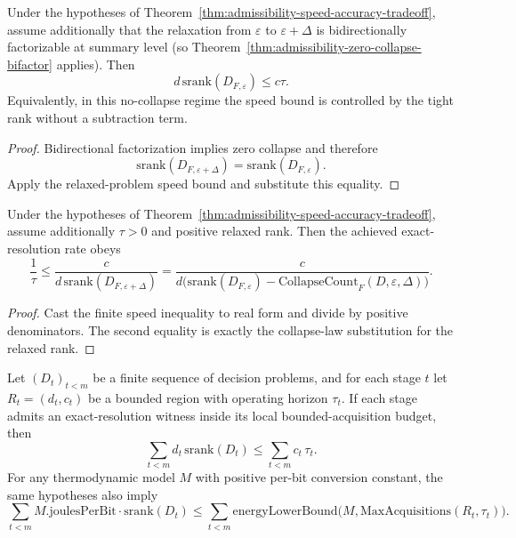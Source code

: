 \begin{theorem}\label{thm:admissibility-speed-accuracy-zero-collapse}
Under the hypotheses of Theorem~\ref{thm:admissibility-speed-accuracy-tradeoff}, assume additionally that the relaxation from $\varepsilon$ to $\varepsilon+\Delta$ is bidirectionally factorizable at summary level (so Theorem~\ref{thm:admissibility-zero-collapse-bifactor} applies). Then
\[
d\,\mathrm{srank}(D_{F,\varepsilon}) \le c\tau.
\]
Equivalently, in this no-collapse regime the speed bound is controlled by the tight rank without a subtraction term.
\end{theorem}

\begin{proof}
Bidirectional factorization implies zero collapse and therefore
\[
\mathrm{srank}(D_{F,\varepsilon+\Delta})=\mathrm{srank}(D_{F,\varepsilon}).
\]
Apply the relaxed-problem speed bound and substitute this equality.
\end{proof}

\begin{theorem}\label{thm:admissibility-onrate-envelope}
Under the hypotheses of Theorem~\ref{thm:admissibility-speed-accuracy-tradeoff}, assume additionally $\tau>0$ and positive relaxed rank. Then the achieved exact-resolution rate obeys
\[
\frac{1}{\tau}
\le
\frac{c}{d\,\mathrm{srank}(D_{F,\varepsilon+\Delta})}
=
\frac{c}{d\bigl(\mathrm{srank}(D_{F,\varepsilon})-
\mathrm{CollapseCount}_F(D,\varepsilon,\Delta)\bigr)}.
\]
\end{theorem}

\begin{proof}
Cast the finite speed inequality to real form and divide by positive denominators. The second equality is exactly the collapse-law substitution for the relaxed rank.
\end{proof}

\begin{theorem}\label{thm:trajectory-time-energy-tradeoff}
Let $(D_t)_{t<m}$ be a finite sequence of decision problems, and for each stage $t$ let $R_t=(d_t,c_t)$ be a bounded region with operating horizon $\tau_t$. If each stage admits an exact-resolution witness inside its local bounded-acquisition budget, then
\[
\sum_{t<m} d_t\,\mathrm{srank}(D_t)
\le
\sum_{t<m} c_t\,\tau_t.
\]
For any thermodynamic model $M$ with positive per-bit conversion constant, the same hypotheses also imply
\[
\sum_{t<m} M.\mathrm{joulesPerBit}\cdot \mathrm{srank}(D_t)
\le
\sum_{t<m} \mathrm{energyLowerBound}\!\bigl(M,\mathrm{MaxAcquisitions}(R_t,\tau_t)\bigr).
\]
\end{theorem}

